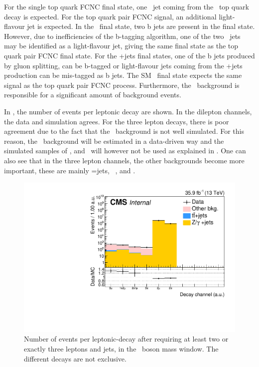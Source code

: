 For the single top quark FCNC final state, one \Pbottom\ jet coming from the \SM\ top quark decay is expected. For the top quark pair FCNC signal, an additional light-flavour jet is expected. In the \ttZ\ final state, two b jets are present in the final state. However, due to inefficiencies of the b-tagging algorithm, one of the two \Pbottom\ jets may be identified as a light-flavour jet, giving the same final state as the top quark pair FCNC final state. For the \WZ+jets final states, one of the b jets produced by gluon splitting, can be b-tagged or light-flavour jets coming from the \WZ+jets production can be mis-tagged as b jets. The SM \tZq\ final state expects the same signal as the top quark pair FCNC process. Furthermore, the \NPL\  background is responsible for a  significant amount of background events. 

In , the number of events per leptonic decay are shown. In the dilepton channels, the data and simulation agrees. For the three lepton decays, there is poor agreement due to the fact that the \NPL\ background is not well simulated.  For this reason, the \NPL\ background will be estimated in a data-driven way and the simulated samples of \DY, \ttbar and \WW\ will however not be used as explained in . One can also see that in the three lepton channels, the other backgrounds become more important, these are mainly \WZ=jets, \SM\ \tZq, and \ZZ.
\begin{figure}
	\centering
	\includegraphics[width=0.7\linewidth]{5_EventSelection/Figures/control_dilep_Decay_StackLogY.pdf}
	\caption{Number of events per leptonic-decay after requiring at least two or exactly three leptons and jets, in the \PZ\ boson mass window. The different decays are not exclusive. }
	\label{fig:controldilepdecaystacklogy}
\end{figure}



